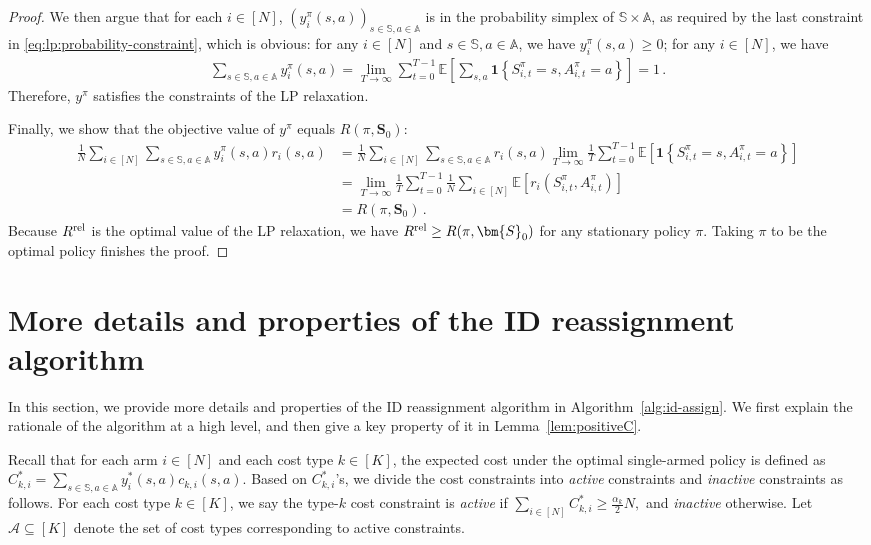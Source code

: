 \documentclass{article}
\theoremstyle{plain}
\theoremstyle{remark}
\newcommand{\sspa}{\mathbb{S}}
\newcommand{\aspa}{\mathbb{A}}
\newcommand{\sumN}{\sum_{i\in[N]}}
\newcommand{\rel}{\textup{rel}} %
\newcommand{\ravg}{R}
\newcommand{\rrel}{\ravg^\rel}
\newcommand{\EE}{\mathbb{E}}
\newcommand{\cA}{\mathcal{A}}
\newcommand{\mbracket}[1]{\left[#1\right]}
\newcommand{\sets}[1]{\left\{ #1 \right\}}
\begin{document}
\begin{proof}
We then argue that for each $i\in [N]$, $(y_i^\pi(s,a))_{s\in\sspa, a\in\aspa}$ is in the probability simplex of $\sspa\times \aspa$, as required by the last constraint in \eqref{eq:lp:probability-constraint}, which is obvious: for any $i\in [N]$ and $s\in\sspa, a\in\aspa$, we have $y^\pi_i(s,a)\geq 0$; for any $i\in[N]$, we have 
\begin{align*}
    \sum_{s\in\sspa,a\in\aspa}y_i^\pi(s,a)= \lim_{T\to\infty}\sum_{t=0}^{T-1} \EE\mbracket{\sum_{s,a}\mathbf{1}\sets{S_{i,t}^\pi=s,A_{i,t}^\pi=a}}=1\,.
\end{align*} Therefore, $y^\pi$ satisfies the constraints of the LP relaxation. 

Finally, we show that the objective value of $y^\pi$ equals $R(\pi,\bm{S}_0)$:
\begin{align*}
    \frac{1}{N}\sumN \sum_{s\in\sspa,a\in\aspa} y_i^\pi(s,a)r_i(s,a)
    &=\frac{1}{N}\sumN \sum_{s\in\sspa,a\in\aspa} r_i(s,a) \lim_{T\to\infty} \frac{1}{T}\sum_{t=0}^{T-1}\EE\mbracket{\mathbf{1}\sets{S_{i,t}^\pi=s,A_{i,t}^\pi=a}}\\
    &= \lim_{T\to\infty} \frac{1}{T} \sum_{t=0}^{T-1}\frac{1}{N}\sumN \EE[r_i(S_{i,t}^\pi,A_{i,t}^\pi)]\\
    &= R(\pi,\bm{S}_0)\,.
\end{align*}
Because $\rrel$ is the optimal value of the LP relaxation, we have $\rrel \geq R(\pi,\bm{S}_0)$ for any stationary policy $\pi$. Taking $\pi$ to be the optimal policy finishes the proof. 
\end{proof}




\section{More details and properties of the ID reassignment algorithm}\label{app:more-ID-reassignment}

In this section, we provide more details and properties of the ID reassignment algorithm in Algorithm~\ref{alg:id-assign}.
We first explain the rationale of the algorithm at a high level, and then give a key property of it in Lemma~\ref{lem:positiveC}.

Recall that for each arm $i\in[N]$ and each cost type $k\in[K]$, the expected cost under the optimal single-armed policy is defined as $C_{k,i}^* =\sum_{s\in\sspa,a\in\aspa}y_i^*(s,a)c_{k,i}(s,a)$.
Based on $C_{k,i}^*$'s, we divide the cost constraints into \emph{active} constraints and \emph{inactive} constraints as follows.
For each cost type $k\in[K]$, we say the type-$k$ cost constraint is \emph{active} if
$\sum_{i\in[N]}C_{k,i}^*\ge \frac{\alpha_k}{2}N,$
and \emph{inactive} otherwise.
Let $\cA\subseteq [K]$ denote the set of cost types corresponding to active constraints.
\end{document}
